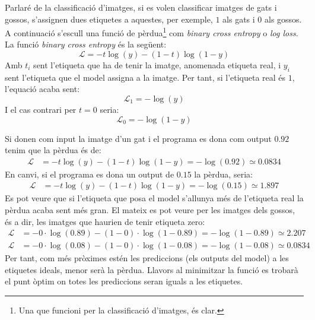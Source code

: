 Parlaré de la classificació d'imatges, si es volen classificar imatges de gats i gossos, s'assignen dues etiquetes a aquestes, per exemple, $1$ als gats i $0$ als gossos. A continuació s'escull una funció de pèrdua\footnote{Una que funcioni per la classificació d'imatges, és clar.} com \textit{binary cross entropy} o \textit{log loss}. La funció \textit{binary cross entropy} és la següent:
\begin{equation}
	\mathcal{L} = - t\log(y) - (1 - t)\log(1 - y) 
	\label{eq:BCE}
\end{equation}
Amb $t_i$ sent l'etiqueta que ha de tenir la imatge, anomenada etiqueta real, i $y_i$ sent l'etiqueta que el model assigna a la imatge. Per tant, si l'etiqueta real és $1$, l'equació acaba sent:
$$
\mathcal{L}_1 = - \log(y)
$$
I el cas contrari per $t = 0$ seria:
$$
\mathcal{L}_0 = - \log(1 - y)
$$

Si donen com input la imatge d'un gat i el programa es dona com output $0.92$ tenim que la pèrdua és de:
\begin{align*}
	\mathcal{L} &= - t\log(y) - (1 - t)\log(1 - y) = - \log(0.92) \simeq 0.0834
\end{align*}
En canvi, si el programa es dona un output de $0.15$ la pèrdua, seria:
\begin{align*}
	\mathcal{L} &= - t\log(y) - (1 - t)\log(1 - y) = - \log(0.15) \simeq 1.897
\end{align*}
Es pot veure que si l'etiqueta que posa el model s'allunya més de l'etiqueta real la pèrdua acaba sent més gran. El mateix es pot veure per les imatges dels gossos, és a dir, les imatges que haurien de tenir etiqueta zero:
\begin{align*}
	\mathcal{L} &= - 0\cdot\log(0.89) - (1 - 0)\cdot\log(1 - 0.89) = - \log(1- 0.89) \simeq 2.207 \\
	\mathcal{L} &= - 0\cdot\log(0.08) - (1 - 0)\cdot\log(1 - 0.08) = - \log(1- 0.08)\simeq 0.0834
\end{align*}
Per tant, com més pròximes estén les prediccions (els outputs del model) a les etiquetes ideals, menor serà la pèrdua. Llavors al minimitzar la funció es trobarà el punt òptim on totes les prediccions seran iguals a les etiquetes.


